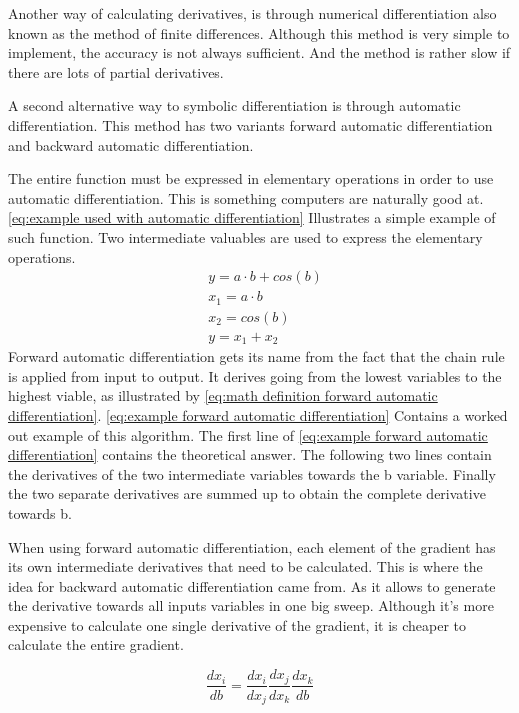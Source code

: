 Another way of calculating derivatives, is through numerical differentiation also known as the method of finite differences. Although this method is very simple to implement, the accuracy is not always sufficient. And the method is rather slow if there are lots of partial derivatives.

A second alternative way to symbolic differentiation is through automatic differentiation. This method has two variants forward automatic differentiation and backward automatic differentiation.

The entire function must be expressed in elementary operations in order to use automatic differentiation. This is something computers are naturally good at. \eqref{eq:example used with automatic differentiation} Illustrates a simple example of such function. Two intermediate valuables are used to express the elementary operations.
\begin{equation}
	\begin{aligned}
		& y = a \cdot b + cos(b) \\
		& x_1 = a \cdot b \\
		& x_2 = cos(b) \\
		& y = x_1 + x_2		
	\end{aligned}
	\label{eq:example used with automatic differentiation}
\end{equation}
Forward automatic differentiation gets its name from the fact that the chain rule is applied from input to output. It derives going from the lowest variables to the highest viable, as illustrated by \eqref{eq:math definition forward automatic differentiation}. \eqref{eq:example forward automatic differentiation} Contains a worked out example of this algorithm. The first line of \eqref{eq:example forward automatic differentiation} contains the theoretical answer. The  following two lines contain the derivatives of the two intermediate variables towards the b variable. Finally the two separate derivatives are summed up to obtain the complete derivative towards b.

When using forward automatic differentiation, each element of the gradient has its own intermediate derivatives that need to be calculated. This is where the idea for backward automatic differentiation came from. As it allows to generate the derivative towards all inputs variables in one big sweep. Although it's more expensive to calculate one single derivative of the gradient, it is cheaper to calculate the entire gradient.

\begin{equation}
	\frac{dx_i}{db} = \frac{dx_i}{dx_j}\frac{dx_j}{dx_k}\frac{dx_k}{db}
	\label{eq:math definition forward automatic differentiation}
\end{equation}

